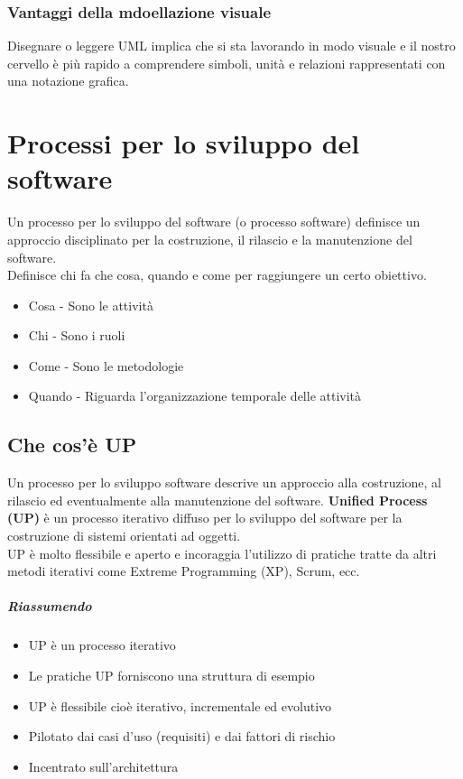 \subsection{Vantaggi della mdoellazione visuale}
Disegnare o leggere UML implica che si sta lavorando in modo visuale e il nostro
cervello è più rapido a comprendere simboli, unità e relazioni rappresentati
con una notazione grafica.

\chapter{Processi per lo sviluppo del software}
Un processo per lo sviluppo del software (o processo software) definisce un approccio disciplinato
per la costruzione, il rilascio e la manutenzione del software.
\\ Definisce chi fa che cosa, quando e come per raggiungere un certo obiettivo.
\begin{itemize}
    \item Cosa - Sono le attività
    \item Chi - Sono i ruoli
    \item Come - Sono le metodologie
    \item Quando - Riguarda l'organizzazione temporale delle attività
\end{itemize}
\section{Che cos'è UP}
Un processo per lo sviluppo software descrive un approccio alla costruzione,
al rilascio ed eventualmente alla manutenzione del software. \textbf{Unified Process (UP)}
 è un processo iterativo diffuso per lo sviluppo del software per la costruzione di sistemi
 orientati ad oggetti.
 \\ UP è molto flessibile e aperto e incoraggia l'utilizzo di pratiche
 tratte da altri metodi iterativi come Extreme Programming (XP), Scrum, ecc.
 \paragraph{Riassumendo}
 \begin{itemize}
    \item UP è un processo iterativo
    \item Le pratiche UP forniscono una struttura di esempio
    \item UP è flessibile cioè iterativo, incrementale ed evolutivo
    \item Pilotato dai casi d'uso (requisiti) e dai fattori di rischio
    \item Incentrato sull'architettura
 \end{itemize}
